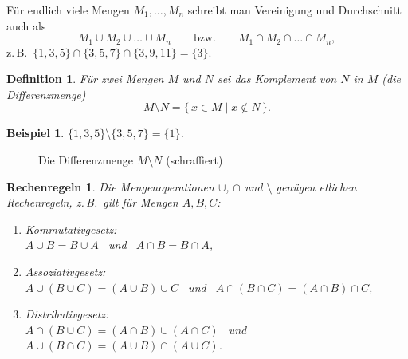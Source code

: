 \documentclass[a4paper]{article}
\theoremstyle{kurzskript}
\newtheorem*{bsp}{Beispiel}
\newtheorem*{defn}{Definition}
\newtheorem*{regeln}{Rechenregeln}
\begin{document}
Für endlich viele Mengen $M_1, \dots, M_n$ schreibt man Vereinigung und Durchschnitt auch als
\[
  M_1 \cup M_2 \cup \dots \cup M_n \qquad\text{bzw.}\qquad M_1 \cap M_2 \cap \dots \cap M_n,
\]
z.\,B.\ $\{1, 3, 5\} \cap \{3, 5, 7\} \cap \{3, 9, 11\} = \{3\}$.

\begin{defn}
Für zwei Mengen $M$ und $N$ sei das \emph{Komplement} von $N$ in $M$ (die \emph{Differenzmenge})
\[
  M \setminus N = \{\, x \in M \mid x \notin N \,\}.
\]
\end{defn}

\begin{bsp}
$\{1, 3, 5\} \setminus \{3, 5, 7\} = \{1\}$.
\end{bsp}

\begin{figure}[H]
\centering
{}
\caption{Die Differenzmenge $M \setminus N$ (schraffiert)}
\end{figure}

\begin{regeln}
Die Mengenoperationen $\cup$, $\cap$ und $\setminus$ genügen etlichen Rechenregeln, z.\,B.\ gilt für Mengen $A, B, C$:
\begin{enumerate}[label=(\arabic*)]
  \item \emph{Kommutativgesetz:} \\
        $A \cup B = B \cup A$ \ und \ $A \cap B = B \cap A$,
  \item \emph{Assoziativgesetz:} \\
        $A \cup (B \cup C) = (A \cup B) \cup C$ \ und \ $A \cap (B \cap C) = (A \cap B) \cap C$,
  \item \emph{Distributivgesetz:} \\
        $A \cap (B \cup C) = (A \cap B) \cup (A \cap C)$ \ und \ $A \cup (B \cap C) = (A \cup B) \cap (A \cup C)$.
\end{enumerate}
\end{regeln}
\end{document}
